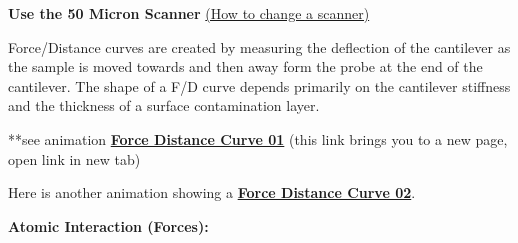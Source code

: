 \documentclass{../lab}
\begin{document}
\textbf{Use the 50 Micron Scanner} \hyperref[subsec:ChangingScanners]{(How to change a scanner)}

Force/Distance curves are created by measuring the deflection of the cantilever as the sample is moved towards and then away form the probe at the end of the cantilever.  The shape of a F/D curve depends primarily on the cantilever stiffness and the thickness of a surface contamination layer.

**see animation \href{http://experimentationlab.berkeley.edu/sites/default/files/AFMImages/Force-distance\_curves\_en\_video.mp4}{\textbf{Force Distance Curve 01}} (this link brings you to a new page, open link in new tab)

Here is another animation showing a \href{http://experimentationlab.berkeley.edu/sites/default/files/AFMImages/6.1\%20Tip\%20Sample.flv\_converted.mp4}{\textbf{Force Distance Curve 02}}.


\textbf{Atomic Interaction (Forces):}
\end{document}
